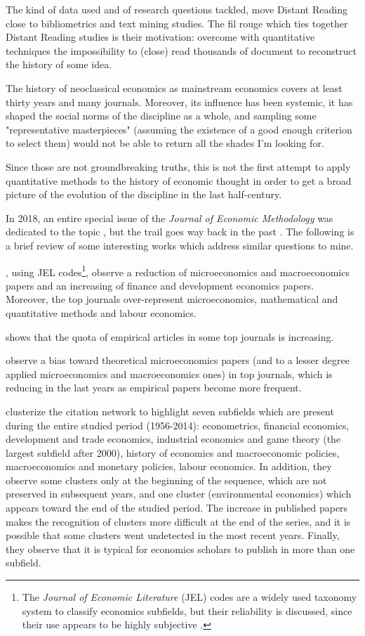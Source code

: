 \documentclass[a4paper, headings=standardclasses]{scrartcl}
\begin{document}
The kind of data used and of research questions tackled, move Distant Reading close to bibliometrics and text mining studies. The fil rouge
which ties together Distant Reading studies is their motivation: overcome with quantitative techniques the impossibility to (close) read thousands of document to reconstruct the history of some idea.

The history of neoclassical economics as mainstream economics covers at least thirty years and many journals. Moreover, its influence has been systemic, it has shaped the social norms of the discipline as a whole, and sampling some "representative masterpieces" (assuming the existence of a good enough criterion to select them) would not be able to return all the shades I'm looking for.

Since those are not groundbreaking truths, this is not the first attempt to apply quantitative methods to the history of economic thought in order to get a broad picture of the evolution of the discipline in the last half-century.

In 2018, an entire special issue of the \textit{Journal of Economic Methodology} was dedicated to the topic \parencite{edwards2018a,cherrier2018a}, but the trail goes way back in the past \parencite{backhouse1997}.
The following is a brief review of some interesting works which address similar questions to mine.

\textcite{kelly2011}, using JEL codes\footnote{The \textit{Journal of Economic Literature} (JEL) codes are a widely used taxonomy system to classify economics subfields, but their reliability is discussed, since their use appears to be highly subjective \parencite{cherrier2017,kosnik2018}.}, observe a reduction of microeconomics and macroeconomics papers and an increasing of finance and development economics papers.
Moreover, the top journals over-represent microeconomics, mathematical and quantitative methods and labour economics.

\textcite{hamermesh2013} shows that the quota of empirical articles in some top journals is increasing.

\textcite{card2013} observe a bias toward theoretical microeconomics papers (and to a lesser degree applied microeconomics and macroeconomics ones) in top journals, which is reducing in the last years as empirical papers become more frequent.

\textcite{claveau2016} clusterize the citation network to highlight seven subfields which are present during the entire studied period (1956-2014): econometrics, financial economics, development and trade economics, industrial economics and game theory (the largest subfield after 2000), history of economics and macroeconomic policies, macroeconomics and monetary policies, labour economics.
In addition, they observe some clusters only at the beginning of the sequence, which are not preserved in subsequent years, and one cluster (environmental economics) which appears toward the end of the studied period.
The increase in published papers makes the recognition of clusters more difficult at the end of the series, and it is possible that some clusters went undetected in the most recent years.
Finally, they observe that it is typical for economics scholars to publish in more than one subfield.
\end{document}
